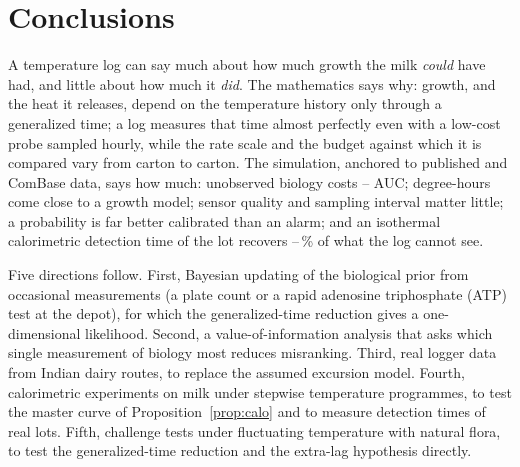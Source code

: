 \section{Conclusions}\label{sec:concl}
A temperature log can say much about how much growth the milk \emph{could} have had, and little about how much it \emph{did}. The mathematics says why: growth, and the heat it releases, depend on the temperature history only through a generalized time; a log measures that time almost perfectly even with a low-cost probe sampled hourly, while the rate scale and the budget against which it is compared vary from carton to carton. The simulation, anchored to published and ComBase data, says how much: unobserved biology costs \NumBaseGapMin--\NumBaseGapMax{} AUC; degree-hours come close to a growth model; sensor quality and sampling interval matter little; a probability is far better calibrated than an alarm; and an isothermal calorimetric detection time of the lot recovers \CalFracMin--\CalFracMax\,\% of what the log cannot see.

Five directions follow. First, Bayesian updating of the biological prior from occasional measurements (a plate count or a rapid adenosine triphosphate (ATP) test at the depot), for which the generalized-time reduction gives a one-dimensional likelihood. Second, a value-of-information analysis that asks which single measurement of biology most reduces misranking. Third, real logger data from Indian dairy routes, to replace the assumed excursion model. Fourth, calorimetric experiments on milk under stepwise temperature programmes, to test the master curve of Proposition~\ref{prop:calo} and to measure detection times of real lots. Fifth, challenge tests under fluctuating temperature with natural flora, to test the generalized-time reduction and the extra-lag hypothesis directly.

